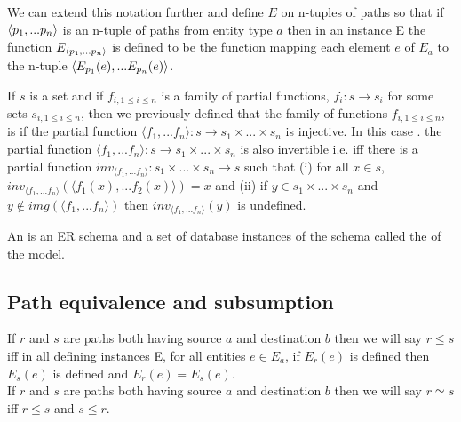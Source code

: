 We can extend this notation further and define $E$ on n-tuples of paths so that if 
$\langle p_1,...p_n\rangle$ is an n-tuple of paths from entity type $a$ then in an instance E
the function  $E_{\langle p_1,...p_n\rangle}$ is defined to be the function mapping each element $e$ 
of $E_a$ to the n-tuple
$\langle E_{p_1}(e),...E_{p_n}(e)\rangle$.


\begin{definition}
If $s$ is a set and if $f_{i, 1\leq i \leq n}$ is a family of partial functions, $f_i: s \rightarrow s_i$   for some sets $s_{i, 1 \leq i \leq n}$,  then
we previously defined that the family of functions $f_{i, 1\leq i \leq n}$, is  if the partial function $\langle f_1,...f_n\rangle: s \rightarrow
s_1 \times ... \times s_n $ is injective. 
In this case .
 the partial function $\langle f_1,...f_n\rangle: s \rightarrow
s_1 \times ... \times s_n $ is also invertible i.e. iff there is a partial function $inv_{\langle f_1,...f_n\rangle} : s_1 \times ... \times s_n \rightarrow s$ such that
(i) for all $x \in s$, $inv_{\langle f_1,...f_n\rangle}(\langle f_1(x),...f_2(x) \rangle ) = x$ and (ii) if $y \in s_1 \times ... \times s_n $ and
$y \notin img(\langle f_1,...f_n\rangle)$ then $inv_{\langle f_1,...f_n\rangle}(y)$ is undefined. \\
\end{definition}


\begin{definition}
\noindent An  is an ER schema and a set of database instances of the schema called the
 of the model. \\
\end{definition}


\subsection{Path equivalence and subsumption}

\noindent If $r$ and $s$ are paths both having source $a$ and destination $b$ then we will say $r \leq s$ iff in all defining instances E, for all 
entities $e \in E_a$, if $E_r(e)$ is defined then $E_s(e)$ is defined and $E_r(e)=E_s(e)$. \\

\noindent If $r$ and $s$ are paths both having source $a$ and destination $b$ then we will say $r \simeq s$ iff $r \leq s$ and $s \leq r$. \\

